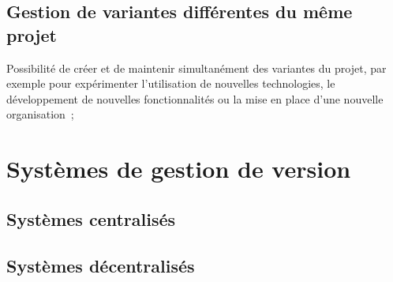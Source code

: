 \subsection{Gestion de variantes différentes du même projet} %

Possibilité de créer et de maintenir simultanément des variantes du
projet, par exemple pour expérimenter l'utilisation de nouvelles
technologies, le développement de nouvelles fonctionnalités ou la mise
en place d'une nouvelle organisation~;

\section{Systèmes de gestion de version} %


\subsection{Systèmes centralisés} %

\cite{Baire1}

\subsection{Systèmes décentralisés} %

\cite{Baire2} %


